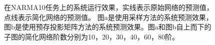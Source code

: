 \begin{figure}
	\centering

	\caption{在NARMA10任务上的系统运行效果，实线表示原始网络的预测值，点线表示简化网络的预测值。
		图a是使用采样方法的系统预测效果，图b是使用预存投影矩阵方法的系统预测效果。图a和图b自上而下的子图的简化网络阶数分别为10，20，30，40，60，80阶。}
	\label{fig:narma10}
\end{figure}



